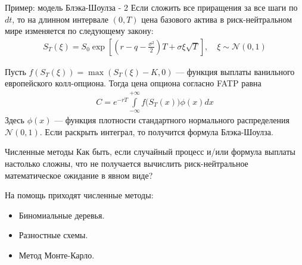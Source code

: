 \documentclass{beamer}
\begin{document}
\begin{frame}{Пример: модель Блэка-Шоулза - 2}
\justify
Если сложить все приращения за все шаги по $dt$, то на длинном интервале $(0, T)$ цена базового актива в риск-нейтральном мире изменяется по следующему закону:
\begin{align*}
S_T(\xi) = S_0\exp{\left[\left(r - q - \frac{\sigma^2}{2}\right)T + \sigma\xi\sqrt{T}\right]}, \quad \xi \sim \mathcal{N}(0, 1)
\end{align*}

\justify
Пусть $f(S_T(\xi)) = \max(S_T(\xi) - K, 0)$ --- функция выплаты ванильного европейского колл-опциона. Тогда цена опциона согласно FATP равна
\begin{align*}
C = e^{-rT} \int\limits_{-\infty}^{+\infty}f\Big(S_T(x)\Big)\phi(x)dx
\end{align*}
Здесь $\phi(x)$ --- функция плотности стандартного нормального распределения $\mathcal{N}(0,1)$. Если раскрыть интеграл, то получится формула Блэка-Шоулза.
\end{frame}



\begin{frame}{Численные методы}
\justify
Как быть, если случайный процесс и/или формула выплаты настолько сложны, что не получается вычислить риск-нейтральное математическое ожидание в явном виде?

\justify
На помощь приходят численные методы:
\begin{itemize}
\item Биномиальные деревья.
\item Разностные схемы.
\item Метод Монте-Карло.
\end{itemize}
\end{frame}
\end{document}
